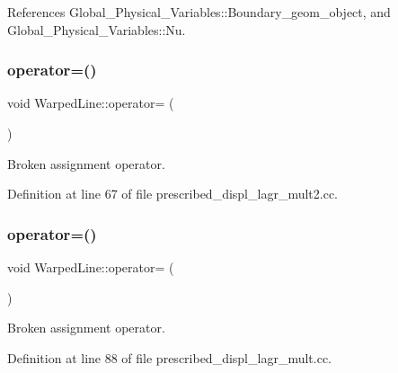 References Global\+\_\+\+Physical\+\_\+\+Variables\+::\+Boundary\+\_\+geom\+\_\+object, and Global\+\_\+\+Physical\+\_\+\+Variables\+::\+Nu.

\mbox{\label{classWarpedLine_ae2ee796906c0caa7e94f277f6fc499e1}} 
\subsubsection{\texorpdfstring{operator=()}{operator=()}\hspace{0.1cm}{\footnotesize\ttfamily [1/3]}}
{\footnotesize\ttfamily void Warped\+Line\+::operator= (\begin{DoxyParamCaption}\item[{const \hyperlink{classWarpedLine}{Warped\+Line} \&}]{ }\end{DoxyParamCaption})\hspace{0.3cm}{\ttfamily [inline]}}



Broken assignment operator. 



Definition at line 67 of file prescribed\+\_\+displ\+\_\+lagr\+\_\+mult2.\+cc.

\mbox{\label{classWarpedLine_ae2ee796906c0caa7e94f277f6fc499e1}} 
\subsubsection{\texorpdfstring{operator=()}{operator=()}\hspace{0.1cm}{\footnotesize\ttfamily [2/3]}}
{\footnotesize\ttfamily void Warped\+Line\+::operator= (\begin{DoxyParamCaption}\item[{const \hyperlink{classWarpedLine}{Warped\+Line} \&}]{ }\end{DoxyParamCaption})\hspace{0.3cm}{\ttfamily [inline]}}



Broken assignment operator. 



Definition at line 88 of file prescribed\+\_\+displ\+\_\+lagr\+\_\+mult.\+cc.

